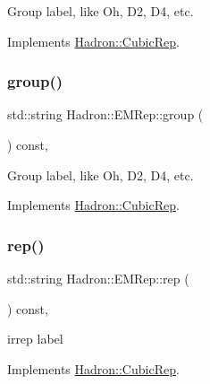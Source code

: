 Group label, like Oh, D2, D4, etc. 

Implements \mbox{\hyperlink{structHadron_1_1CubicRep_a0748f11ec87f387062c8e8981339a29c}{Hadron\+::\+Cubic\+Rep}}.

\mbox{\label{structHadron_1_1EMRep_aa1ca6e0e98d03340cb05616f1ea52f79}} 
\subsubsection{\texorpdfstring{group()}{group()}\hspace{0.1cm}{\footnotesize\ttfamily [2/2]}}
{\footnotesize\ttfamily std\+::string Hadron\+::\+E\+M\+Rep\+::group (\begin{DoxyParamCaption}{ }\end{DoxyParamCaption}) const\hspace{0.3cm}{\ttfamily [inline]}, {\ttfamily [virtual]}}

Group label, like Oh, D2, D4, etc. 

Implements \mbox{\hyperlink{structHadron_1_1CubicRep_a0748f11ec87f387062c8e8981339a29c}{Hadron\+::\+Cubic\+Rep}}.

\mbox{\label{structHadron_1_1EMRep_a38de805af0f4c022d2b7f70ac03c62ce}} 
\subsubsection{\texorpdfstring{rep()}{rep()}\hspace{0.1cm}{\footnotesize\ttfamily [1/2]}}
{\footnotesize\ttfamily std\+::string Hadron\+::\+E\+M\+Rep\+::rep (\begin{DoxyParamCaption}{ }\end{DoxyParamCaption}) const\hspace{0.3cm}{\ttfamily [inline]}, {\ttfamily [virtual]}}

irrep label 

Implements \mbox{\hyperlink{structHadron_1_1CubicRep_ac3eb63608803d44c68681f158e14eb1b}{Hadron\+::\+Cubic\+Rep}}.

\mbox{\label{structHadron_1_1EMRep_a38de805af0f4c022d2b7f70ac03c62ce}} 
